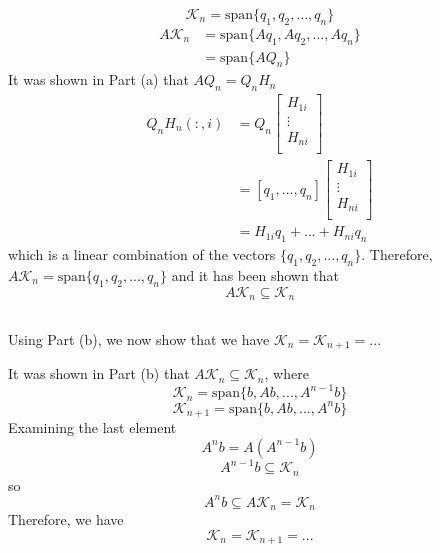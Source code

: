 \documentclass[11pt]{article} %
\begin{document}
\begin{equation}
 \mathcal{K}_n = \text{span}\{ q_1, q_2, ... , q_n \}
\end{equation}
\begin{equation}
\begin{split}
 A\mathcal{K}_n & = \text{span}\{ A q_1, A q_2, ... , Aq_n \} \\
& = \text{span} \{ AQ_n \}
\end{split}
\end{equation}
It was shown in Part (a) that $A Q_n = Q_n H_n$
\begin{equation}
\begin{split}
Q_n H_n (:,i) &= Q_n \left[
\begin{array}{c}
H_{1i}\\
\vdots \\
H_{ni}\\
\end{array}
\right] \\
&=\left [ q_1, ..., q_n \right ]
\left[
\begin{array}{c}
H_{1i}\\
\vdots \\
H_{ni}\\
\end{array}
\right] \\
& = H_{1i} q_1 + ... + H_{ni}q_n
\end{split}
\end{equation}
which is a linear combination of the vectors $\{ q_1, q_2, ... , q_n \}$. Therefore, $ A \mathcal{K}_n = \text{span}\{ q_1, q_2, ... , q_n \}$ and it has been shown that
\begin{equation}
\boxed{A \mathcal{K}_n \subseteq \mathcal{K}_n}
\end{equation}

\subsection{} %
Using Part (b), we now show that we have  $ \mathcal{K}_n =   \mathcal{K}_{n+1} = ...$

It was shown in Part (b) that $A \mathcal{K}_n \subseteq \mathcal{K}_n$, where
\begin{equation}
 \mathcal{K}_n = \text{span}\{ b, Ab, ... , A^{n-1}b \}
\end{equation}
\begin{equation}
 \mathcal{K}_{n+1} = \text{span}\{ b, Ab, ... , A^n b \}
\end{equation}
Examining the last element
\begin{equation}
A^n b = A( A ^{n-1} b)
\end{equation}
\begin{equation}
A^{n-1}b \subseteq \mathcal{K}_n
\end{equation}
so
\begin{equation}
A^n b \subseteq A \mathcal{K}_n = \mathcal{K}_n
\end{equation}
Therefore, we have
\begin{equation}
\boxed{ \mathcal{K}_n =   \mathcal{K}_{n+1} = ...}
\end{equation}
\end{document}
